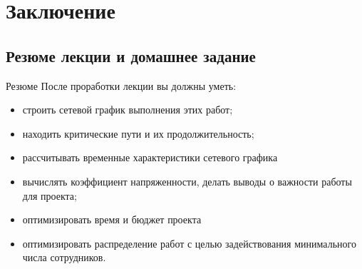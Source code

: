 \documentclass[unicode,11pt,notheorems]{beamer}
\begin{document}
 
%
%
%

%
%





\section{Заключение}
\subsection{Резюме лекции и домашнее задание}
\begin{frame}{Резюме}
	После проработки лекции вы должны уметь:
	\begin{itemize}
	\item 
		строить сетевой график выполнения этих работ;
	\item 
		находить критические пути и их продолжительность;
	
	\item 
		рассчитывать временные характеристики сетевого графика
	\item 
		вычислять коэффициент напряженности, делать выводы о важности работы для проекта;
	\item 
		оптимизировать время и бюджет проекта
	\item 
		оптимизировать распределение работ с целью задействования минимального числа сотрудников.
	\end{itemize}		
\end{frame}
\end{document}
